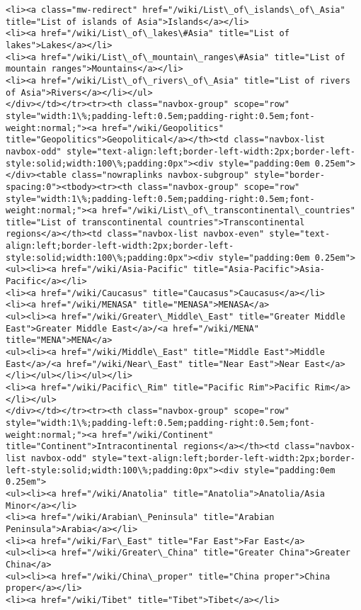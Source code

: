 \documentclass[11pt]{article}
\begin{document}
\begin{Verbatim}[commandchars=\\\{\}]
<li><a class="mw-redirect" href="/wiki/List\_of\_islands\_of\_Asia" title="List of islands of Asia">Islands</a></li>
<li><a href="/wiki/List\_of\_lakes\#Asia" title="List of lakes">Lakes</a></li>
<li><a href="/wiki/List\_of\_mountain\_ranges\#Asia" title="List of mountain ranges">Mountains</a></li>
<li><a href="/wiki/List\_of\_rivers\_of\_Asia" title="List of rivers of Asia">Rivers</a></li></ul>
</div></td></tr><tr><th class="navbox-group" scope="row" style="width:1\%;padding-left:0.5em;padding-right:0.5em;font-weight:normal;"><a href="/wiki/Geopolitics" title="Geopolitics">Geopolitical</a></th><td class="navbox-list navbox-odd" style="text-align:left;border-left-width:2px;border-left-style:solid;width:100\%;padding:0px"><div style="padding:0em 0.25em"></div><table class="nowraplinks navbox-subgroup" style="border-spacing:0"><tbody><tr><th class="navbox-group" scope="row" style="width:1\%;padding-left:0.5em;padding-right:0.5em;font-weight:normal;"><a href="/wiki/List\_of\_transcontinental\_countries" title="List of transcontinental countries">Transcontinental regions</a></th><td class="navbox-list navbox-even" style="text-align:left;border-left-width:2px;border-left-style:solid;width:100\%;padding:0px"><div style="padding:0em 0.25em">
<ul><li><a href="/wiki/Asia-Pacific" title="Asia-Pacific">Asia-Pacific</a></li>
<li><a href="/wiki/Caucasus" title="Caucasus">Caucasus</a></li>
<li><a href="/wiki/MENASA" title="MENASA">MENASA</a>
<ul><li><a href="/wiki/Greater\_Middle\_East" title="Greater Middle East">Greater Middle East</a>/<a href="/wiki/MENA" title="MENA">MENA</a>
<ul><li><a href="/wiki/Middle\_East" title="Middle East">Middle East</a>/<a href="/wiki/Near\_East" title="Near East">Near East</a></li></ul></li></ul></li>
<li><a href="/wiki/Pacific\_Rim" title="Pacific Rim">Pacific Rim</a></li></ul>
</div></td></tr><tr><th class="navbox-group" scope="row" style="width:1\%;padding-left:0.5em;padding-right:0.5em;font-weight:normal;"><a href="/wiki/Continent" title="Continent">Intracontinental regions</a></th><td class="navbox-list navbox-odd" style="text-align:left;border-left-width:2px;border-left-style:solid;width:100\%;padding:0px"><div style="padding:0em 0.25em">
<ul><li><a href="/wiki/Anatolia" title="Anatolia">Anatolia/Asia Minor</a></li>
<li><a href="/wiki/Arabian\_Peninsula" title="Arabian Peninsula">Arabia</a></li>
<li><a href="/wiki/Far\_East" title="Far East">Far East</a>
<ul><li><a href="/wiki/Greater\_China" title="Greater China">Greater China</a>
<ul><li><a href="/wiki/China\_proper" title="China proper">China proper</a></li>
<li><a href="/wiki/Tibet" title="Tibet">Tibet</a></li>

\end{Verbatim}
\end{document}
